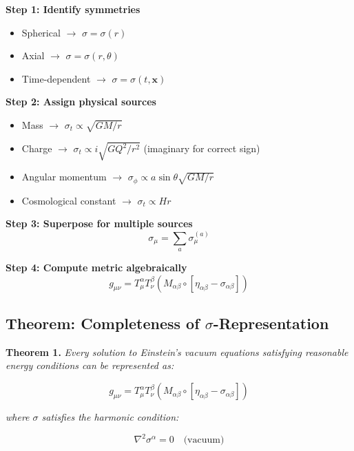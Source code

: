 \documentclass[11pt,a4paper]{article}
\theoremstyle{definition}
\theoremstyle{remark}
\begin{document}
	\textbf{Step 1: Identify symmetries}
	\begin{itemize}
		\item Spherical $\to$ $\sigma = \sigma(r)$
		\item Axial $\to$ $\sigma = \sigma(r,\theta)$  
		\item Time-dependent $\to$ $\sigma = \sigma(t,\mathbf{x})$
	\end{itemize}
	
	\textbf{Step 2: Assign physical sources}
	\begin{itemize}
		\item Mass $\to$ $\sigma_t \propto \sqrt{GM/r}$
		\item Charge $\to$ $\sigma_t \propto i\sqrt{GQ^2/r^2}$ (imaginary for correct sign)
		\item Angular momentum $\to$ $\sigma_\phi \propto a\sin\theta \sqrt{GM/r}$
		\item Cosmological constant $\to$ $\sigma_t \propto Hr$
	\end{itemize}
	
	\textbf{Step 3: Superpose for multiple sources}
	\begin{equation}
		\sigma_\mu = \sum_a \sigma_\mu^{(a)}
	\end{equation}
	
	\textbf{Step 4: Compute metric algebraically}
	\begin{equation}
		g_{\mu\nu} = T^\alpha_\mu T^\beta_\nu(M_{\alpha\beta} \circ [\eta_{\alpha\beta} - \sigma_{\alpha\beta}])
	\end{equation}
	
	\subsection{Theorem: Completeness of $\sigma$-Representation}
	
	\textbf{Theorem 1.} \emph{Every solution to Einstein's vacuum equations satisfying reasonable energy conditions can be represented as:}
	
	\begin{equation}
		g_{\mu\nu} = T^\alpha_\mu T^\beta_\nu(M_{\alpha\beta} \circ [\eta_{\alpha\beta} - \sigma_{\alpha\beta}])
	\end{equation}
	
	\emph{where $\sigma$ satisfies the harmonic condition:}
	
	\begin{equation}
		\nabla^2\sigma^\alpha = 0 \quad \text{(vacuum)}
	\end{equation}
	
\end{document}
